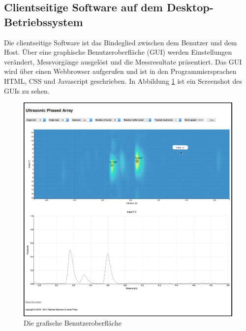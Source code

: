 \clearpage
\subsection{Clientseitige Software auf dem Desktop-Betriebssystem}\label{sec:clientseitige_software_auf_dem_desktop_betriebssystem}
Die clientseitige Software ist das Bindeglied zwischen dem Benutzer und dem Host. Über eine graphische Benutzeroberfläche (GUI) werden Einstellungen verändert, Messvorgänge ausgelöst und die Messresultate präsentiert. Das GUI wird über einen Webbrowser aufgerufen und ist in den Programmiersprachen HTML, CSS und Javascript geschrieben. In Abbildung \ref{fig:image_software_client} ist ein Screenshot des GUIs zu sehen.

\begin{figure}[htb]
\begin{center}
\includegraphics[width=\textwidth]{graphics/image_software_client.png}
\end{center}
\caption{Die grafische Benutzeroberfläche} %
\label{fig:image_software_client}
\end{figure}
%

